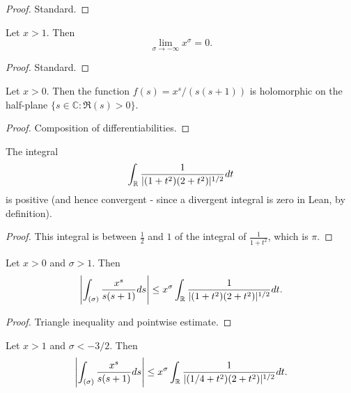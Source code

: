 \begin{proof}\leanok
Standard.

\end{proof}


\begin{lemma}\label{tendsto_rpow_atTop_nhds_zero_of_norm_gt_one}\leanok
Let $x>1$. Then
$$\lim_{\sigma\to-\infty}x^\sigma=0.$$
\end{lemma}


\begin{proof}\leanok
Standard.
\end{proof}


\begin{lemma}[isHolomorphicOn]\label{isHolomorphicOn}\leanok
Let $x>0$. Then the function $f(s) = x^s/(s(s+1))$ is holomorphic on the half-plane $\{s\in\mathbb{C}:\Re(s)>0\}$.
\end{lemma}


\begin{proof}\leanok
Composition of differentiabilities.

\end{proof}


\begin{lemma}[integralPosAux]\label{integralPosAux}\leanok
The integral
$$\int_\R\frac{1}{|(1+t^2)(2+t^2)|^{1/2}}dt$$
is positive (and hence convergent - since a divergent integral is zero in Lean, by definition).
\end{lemma}


\begin{proof}\leanok
This integral is between $\frac{1}{2}$ and $1$ of the integral of $\frac{1}{1+t^2}$, which is $\pi$.

\end{proof}


\begin{lemma}[vertIntBound]\label{vertIntBound}\leanok
Let $x>0$ and $\sigma>1$. Then
$$\left|
\int_{(\sigma)}\frac{x^s}{s(s+1)}ds\right| \leq x^\sigma \int_\R\frac{1}{|(1+t^2)(2+t^2)|^{1/2}}dt.$$
\end{lemma}


\begin{proof}\leanok
{}
Triangle inequality and pointwise estimate.
\end{proof}


\begin{lemma}[vertIntBoundLeft]\label{vertIntBoundLeft}\leanok
Let $x>1$ and $\sigma<-3/2$. Then
$$\left|
\int_{(\sigma)}\frac{x^s}{s(s+1)}ds\right| \leq x^\sigma \int_\R\frac{1}{|(1/4+t^2)(2+t^2)|^{1/2}}dt.$$
\end{lemma}


